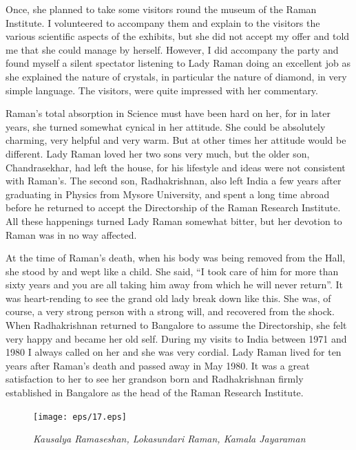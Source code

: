 Once, she planned to take some visitors round the museum of the Raman Institute. I volunteered to accompany them and explain to the visitors the various scientific aspects of the exhibits, but she did not accept my offer and told me that she could manage by herself. However, I did accompany the party and found myself a silent spectator listening to Lady Raman doing an excellent job as she explained the nature of crystals, in particular the nature of diamond, in very simple language. The visitors, were quite impressed with her commentary.

Raman's total absorption in Science must have been hard on her, for in later years, she turned somewhat cynical in her attitude. She could be absolutely charming, very helpful and very warm. But at other times her attitude would be different. Lady Raman loved her two sons very much, but the older son, Chandrasekhar, had left the house, for his lifestyle and ideas were not consistent with Raman's. The second son, Radhakrishnan, also left India a few years after graduating in Physics from Mysore University, and spent a long time abroad before he returned to accept the Directorship of the Raman Research Institute. All these happenings turned Lady Raman somewhat bitter, but her devotion to Raman was in no way affected.

At the time of Raman's death, when his body was being removed from the Hall, she stood by and wept like a child. She said, ``I took care of him for more than sixty years and you are all taking him away from which he will never return''. It was heart-rending to see the grand old lady break down like this. She was, of course, a very strong person with a strong will, and recovered from the shock. When Radhakrishnan returned to Bangalore to assume the Directorship, she felt very happy and became her old self. During my visits to India between 1971 and 1980 I always called on her and she was very cordial. Lady Raman lived for ten years after Raman's death and passed away in May 1980. It was a great satisfaction to her to see her grandson born and Radhakrishnan firmly established in Bangalore as the head of the Raman Research Institute.
\begin{figure}[H]
\centering
\texttt{[image: eps/17.eps]}

{\fontsize{10pt}{12pt}\selectfont \em Kausalya Ramaseshan, Lokasundari Raman, Kamala Jayaraman}\relax
\end{figure}

